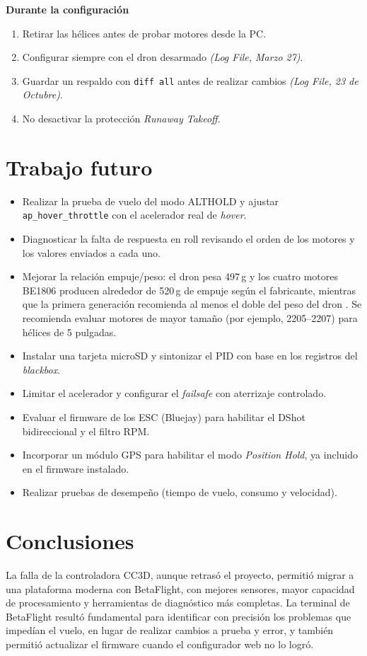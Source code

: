 \documentclass[11pt,letterpaper]{article}
\newcommand{\logref}[1]{\textit{(Log File, #1)}}
\begin{document}
\noindent\textbf{Durante la configuración}
\begin{enumerate}[nosep]
    \item Retirar las hélices antes de probar motores desde la PC.
    \item Configurar siempre con el dron desarmado \logref{Marzo 27}.
    \item Guardar un respaldo con \texttt{diff all} antes de realizar cambios \logref{23 de Octubre}.
    \item No desactivar la protección \textit{Runaway Takeoff}.
\end{enumerate}

\section{Trabajo futuro}
\begin{itemize}[nosep]
    \item Realizar la prueba de vuelo del modo ALTHOLD y ajustar \texttt{ap\_hover\_throttle} con el acelerador real de \textit{hover}.
    \item Diagnosticar la falta de respuesta en roll revisando el orden de los motores y los valores enviados a cada uno.
    \item Mejorar la relación empuje/peso: el dron pesa 497\,g y los cuatro motores BE1806 producen alrededor de 520\,g de empuje según el fabricante, mientras que la primera generación recomienda al menos el doble del peso del dron \cite{reporte2021}. Se recomienda evaluar motores de mayor tamaño (por ejemplo, 2205--2207) para hélices de 5 pulgadas.
    \item Instalar una tarjeta microSD y sintonizar el PID con base en los registros del \textit{blackbox}.
    \item Limitar el acelerador y configurar el \textit{failsafe} con aterrizaje controlado.
    \item Evaluar el firmware de los ESC (Bluejay) para habilitar el DShot bidireccional y el filtro RPM.
    \item Incorporar un módulo GPS para habilitar el modo \textit{Position Hold}, ya incluido en el firmware instalado.
    \item Realizar pruebas de desempeño (tiempo de vuelo, consumo y velocidad).
\end{itemize}

\section{Conclusiones}
La falla de la controladora CC3D, aunque retrasó el proyecto, permitió migrar a una plataforma moderna con BetaFlight, con mejores sensores, mayor capacidad de procesamiento y herramientas de diagnóstico más completas. La terminal de BetaFlight resultó fundamental para identificar con precisión los problemas que impedían el vuelo, en lugar de realizar cambios a prueba y error, y también permitió actualizar el firmware cuando el configurador web no lo logró.
\end{document}
